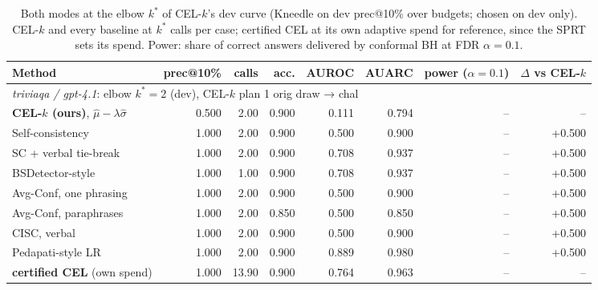\begin{table}[t]
\centering
\small
\begin{tabular}{lrrrrrrr}
\toprule
Method & prec@10\% & calls & acc. & AUROC & AUARC & power ($\alpha{=}0.1$) & $\Delta$ vs CEL-$k$ \\
\midrule
\multicolumn{8}{l}{\emph{triviaqa / gpt-4.1}: elbow $k^* = 2$ (dev), CEL-$k$ plan 1 orig draw → chal} \\
\textbf{CEL-$k$ (ours)}, $\hat\mu - \lambda\hat\sigma$ & 0.500 & 2.00 & 0.900 & 0.111 & 0.794 & -- & -- \\
Self-consistency & 1.000 & 2.00 & 0.900 & 0.500 & 0.900 & -- & +0.500 \\
SC + verbal tie-break & 1.000 & 2.00 & 0.900 & 0.708 & 0.937 & -- & +0.500 \\
BSDetector-style & 1.000 & 1.00 & 0.900 & 0.708 & 0.937 & -- & +0.500 \\
Avg-Conf, one phrasing \citep{xiong2023} & 1.000 & 2.00 & 0.900 & 0.500 & 0.900 & -- & +0.500 \\
Avg-Conf, paraphrases \citep{xiong2023} & 1.000 & 2.00 & 0.850 & 0.500 & 0.850 & -- & +0.500 \\
CISC, verbal \citep{taubenfeld2025} & 1.000 & 2.00 & 0.900 & 0.500 & 0.900 & -- & +0.500 \\
Pedapati-style LR \citep{pedapati2024} & 1.000 & 2.00 & 0.900 & 0.889 & 0.980 & -- & +0.500 \\
\textbf{certified CEL} (own spend) & 1.000 & 13.90 & 0.900 & 0.764 & 0.963 & -- & -- \\
\bottomrule
\end{tabular}
\caption{Both modes at the elbow $k^*$ of CEL-$k$'s dev curve (Kneedle on dev prec@10\% over budgets; chosen on dev only). CEL-$k$ and every baseline at $k^*$ calls per case; certified CEL at its own adaptive spend for reference, since the SPRT sets its spend. Power: share of correct answers delivered by conformal BH at FDR $\alpha = 0.1$.}
\label{tab:elbow}
\end{table}
